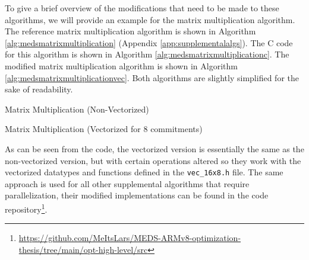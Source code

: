 \documentclass[11pt,a4paper]{report}
\theoremstyle{definition}
\begin{document}
To give a brief overview of the modifications that need to be made to these algorithms, we will provide an example for the matrix multiplication algorithm. The reference matrix multiplication algorithm is shown in Algorithm \ref{alg:medsmatrixmultiplication} (Appendix \ref{app:supplementalalgs}). The C code for this algorithm is shown in Algorithm \ref{alg:medsmatrixmultiplicationc}. The modified matrix multiplication algorithm is shown in Algorithm \ref{alg:medsmatrixmultiplicationvec}. Both algorithms are slightly simplified for the sake of readability.

\begin{algorithm}
  \caption{Matrix Multiplication (Non-Vectorized)}
  \label{alg:medsmatrixmultiplicationc}
  
\end{algorithm}

\begin{algorithm}
  \caption{Matrix Multiplication (Vectorized for 8 commitments)}
  \label{alg:medsmatrixmultiplicationvec}
  
\end{algorithm}

As can be seen from the code, the vectorized version is essentially the same as the non-vectorized version, but with certain operations altered so they work with the vectorized datatypes and functions defined in the \texttt{vec\_16x8.h} file. The same approach is used for all other supplemental algorithms that require parallelization, their modified implementations can be found in the code repository\footnote{\url{https://github.com/MeItsLars/MEDS-ARMv8-optimization-thesis/tree/main/opt-high-level/src}}.
\end{document}
